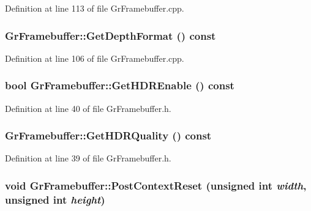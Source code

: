 Definition at line 113 of file GrFramebuffer.cpp.\hypertarget{class_gr_framebuffer_fbeb94553e42babfc069cae3da658a38}{
\subsubsection[{GetDepthFormat}]{ GrFramebuffer::GetDepthFormat () const}}
\label{class_gr_framebuffer_fbeb94553e42babfc069cae3da658a38}




Definition at line 106 of file GrFramebuffer.cpp.\hypertarget{class_gr_framebuffer_6e6bc83db539cd14a8bb7128e9416b46}{
\subsubsection[{GetHDREnable}]{\setlength{\rightskip}{0pt plus 5cm}bool GrFramebuffer::GetHDREnable () const}}
\label{class_gr_framebuffer_6e6bc83db539cd14a8bb7128e9416b46}




Definition at line 40 of file GrFramebuffer.h.\hypertarget{class_gr_framebuffer_d139490101238ff1b4ab0f7e573da734}{
\subsubsection[{GetHDRQuality}]{ GrFramebuffer::GetHDRQuality () const}}
\label{class_gr_framebuffer_d139490101238ff1b4ab0f7e573da734}




Definition at line 39 of file GrFramebuffer.h.\hypertarget{class_gr_framebuffer_12d434b383528bee386ad8b08ddc8c0a}{
\subsubsection[{PostContextReset}]{\setlength{\rightskip}{0pt plus 5cm}void GrFramebuffer::PostContextReset (unsigned int {\em width}, \/  unsigned int {\em height})}}
\label{class_gr_framebuffer_12d434b383528bee386ad8b08ddc8c0a}




